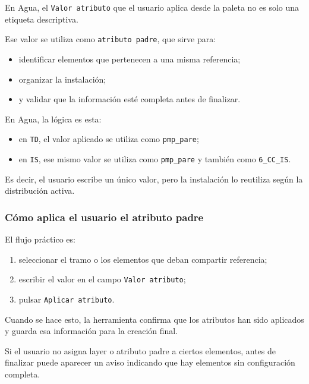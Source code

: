 En Agua, el \texttt{Valor atributo} que el usuario aplica desde la paleta no es solo una etiqueta descriptiva.

Ese valor se utiliza como \texttt{atributo padre}, que sirve para:

\begin{itemize}
\item identificar elementos que pertenecen a una misma referencia;
\item organizar la instalación;
\item y validar que la información esté completa antes de finalizar.
\end{itemize}

En Agua, la lógica es esta:

\begin{itemize}
\item en \texttt{TD}, el valor aplicado se utiliza como \texttt{pmp\_pare};
\item en \texttt{IS}, ese mismo valor se utiliza como \texttt{pmp\_pare} y también como \texttt{6\_CC\_IS}.
\end{itemize}

Es decir, el usuario escribe un único valor, pero la instalación lo reutiliza según la distribución activa.

\subsubsection{Cómo aplica el usuario el atributo padre}

El flujo práctico es:

\begin{enumerate}
\item seleccionar el tramo o los elementos que deban compartir referencia;
\item escribir el valor en el campo \texttt{Valor atributo};
\item pulsar \texttt{Aplicar atributo}.
\end{enumerate}

Cuando se hace esto, la herramienta confirma que los atributos han sido aplicados y guarda esa información para la creación final.

Si el usuario no asigna layer o atributo padre a ciertos elementos, antes de finalizar puede aparecer un aviso indicando que hay elementos sin configuración completa.


